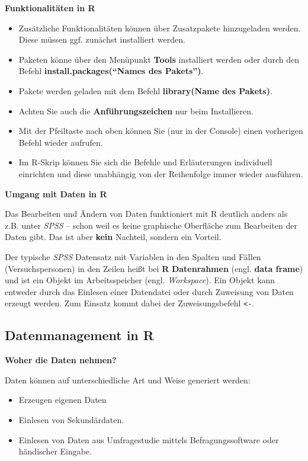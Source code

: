 \documentclass[10pt,ngerman,onside]{article}
\providecommand{\tightlist}{%
  \setlength{\itemsep}{0pt}\setlength{\parskip}{0pt}}
\begin{document}
\textbf{Funktionalitäten in R}

\begin{itemize}
\tightlist
\item
  Zusätzliche Funktionalitäten können über Zusatzpakete hinzugeladen
  werden. Diese müssen ggf. zunächst installiert werden.
\item
  Paketen könne über den Menüpunkt \textbf{Tools} installiert werden
  oder durch den Befehl \textbf{install.packages(``Names des Pakets'')}.
\item
  Pakete werden geladen mit dem Befehl \textbf{library(Name des
  Pakets)}.
\item
  Achten Sie auch die \textbf{Anführungszeichen} nur beim Installieren.
\item
  Mit der Pfeiltaste nach oben können Sie (nur in der Console) einen
  vorherigen Befehl wieder aufrufen.
\item
  Im R-Skrip können Sie sich die Befehle und Erläuterungen individuell
  einrichten und diese unabhängig von der Reihenfolge immer wieder
  ausführen.
\end{itemize}

\textbf{Umgang mit Daten in R}

Das Bearbeiten und Ändern von Daten funktioniert mit R deutlich anders
als z.B. unter \emph{SPSS} -- schon weil es keine graphische Oberfläche
zum Bearbeiten der Daten gibt. Das ist aber \textbf{kein} Nachteil,
sondern ein Vorteil.

Der typische \emph{SPSS} Datensatz mit Variablen in den Spalten und
Fällen (Versuchspersonen) in den Zeilen heißt bei \textbf{R}
\textbf{Datenrahmen} (engl. \textbf{data frame}) und ist ein Objekt im
Arbeitsspeicher (engl. \emph{Workspace}). Ein Objekt kann entweder durch
das Einlesen einer Datendatei oder durch Zuweisung von Daten erzeugt
werden. Zum Einsatz kommt dabei der Zuweisungsbefehl
\texttt{\textless{}-}.

\hypertarget{datenmanagement-in-r}{%
\subsection{Datenmanagement in R}\label{datenmanagement-in-r}}

\textbf{Woher die Daten nehmen?}

Daten können auf unterschiedliche Art und Weise generiert werden:

\begin{itemize}
\tightlist
\item
  Erzeugen eigenen Daten
\item
  Einlesen von Sekundärdaten.
\item
  Einlesen von Daten aus Umfragestudie mittels Befragungssoftware oder
  händischer Eingabe.
\end{itemize}
\end{document}
